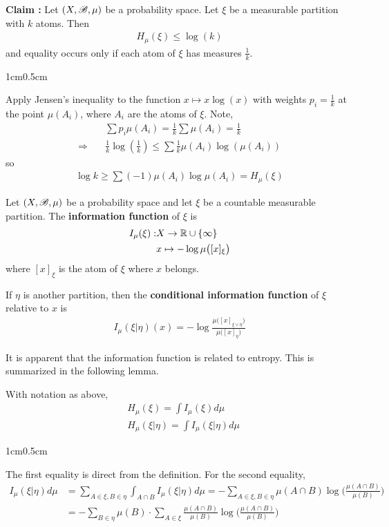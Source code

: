 \documentclass[10pt,a4paper]{report}
\newenvironment{proof}
{\begin{changemargin}{1cm}{0.5cm} 
	}%
	{\end{changemargin}
}
\begin{document}
\textbf{Claim :} Let $(X,\mathscr{B}, \mu)$ be a probability space. Let $\xi$ be a measurable partition with $k$ atoms. Then
\begin{align*}
H_{\mu}(\xi) \leq \log (k)
\end{align*}
and equality occurs only if each atom of $\xi$ has measures $\frac{1}{k}$.
\begin{proof}
\pf Apply Jensen's inequality to the function $x\mapsto x \log (x)$ with weights $p_i = \frac{1}{k}$ at the point $\mu(A_i)$, where $A_i$ are the atoms of $\xi$. Note,
\begin{align*}
& \sum p_i \mu(A_i) = \frac{1}{k} \sum \mu(A_i) = \frac{1}{k} \\
\Rightarrow \quad & \frac{1}{k} \log (\frac{1}{k}) \leq \sum \frac{1}{k} \mu(A_i) \log (\mu(A_i))
\end{align*}
so
\begin{align*}
\log k \geq \sum (-1) \mu(A_i) \log \mu(A_i) = H_{\mu}(\xi)
\end{align*}

\eop
\end{proof}

\s

 Let $(X, \mathscr{B}, \mu)$ be a probability space and let $\xi$ be a countable measurable partition. The \textbf{information function} of $\xi$ is
\begin{align*}
I_{\mu} (\xi) : & X \rightarrow \mathbb{R} \cup \{\infty \} \\
& x\mapsto -\log \mu \big( [x]_{\xi} \big)
\end{align*}
where $[x]_{\xi}$ is the atom of $\xi$ where $x$ belongs.

\quad If $\eta$ is another partition, then the \textbf{conditional information function} of $\xi$ relative to $x$ is
\begin{align*}
I_{\mu} (\xi | \eta) (x)  = - \log \frac{\mu \big( [x]_{\xi \vee \eta} \big)}{\mu \big( [x]_{\eta} \big)}
\end{align*}
\s

It is apparent that the information function is related to entropy. This is summarized in the following lemma.
\s

\lem With notation as above,
\begin{align*}
& H_{\mu}(\xi) = \int I_{\mu} (\xi) d \mu \\
& H_{\mu}(\xi | \eta) = \int I_{\mu} (\xi | \eta) d \mu
\end{align*}
\begin{proof}
\pf The first equality is direct from the definition. For the second equality,
\begin{align*}
I_{\mu} (\xi |\eta) d\mu &= \sum_{A\in \xi, B \in \eta} \int_{A \cap B} I_{\mu}(\xi | \eta) d\mu = - \sum_{A \in \xi, B\in \eta} \mu(A\cap B) \log \Big( \frac{\mu(A \cap B)}{\mu(B)}\Big) \\
&= -\sum_{B\in \eta} \mu(B) \cdot \sum_{A\in \xi} \frac{\mu(A\cap B)}{\mu(B)} \log \Big( \frac{\mu(A\cap B)}{\mu(B)} \Big)
\end{align*}

\eop
\end{proof}
\s
\end{document}
